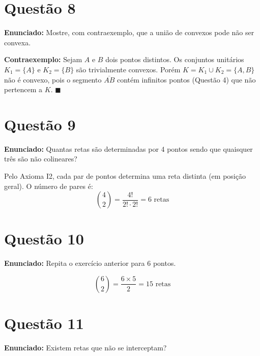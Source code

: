 \documentclass[12pt,a4paper]{article}
\begin{document}
\section*{Quest\~ao 8}

\textbf{Enunciado:} Mostre, com contraexemplo, que a uni\~ao de convexos pode n\~ao ser convexa.

\textbf{Contraexemplo:} Sejam $A$ e $B$ dois pontos distintos. Os conjuntos unit\'arios $K_1 = \{A\}$ e $K_2 = \{B\}$ s\~ao trivialmente convexos. Por\'em $K = K_1 \cup K_2 = \{A, B\}$ n\~ao \'e convexo, pois o segmento $\overline{AB}$ cont\'em infinitos pontos (Quest\~ao 4) que n\~ao pertencem a $K$. $\blacksquare$

\section*{Quest\~ao 9}

\textbf{Enunciado:} Quantas retas s\~ao determinadas por 4 pontos sendo que quaisquer tr\^es s\~ao n\~ao colineares?

Pelo Axioma I2, cada par de pontos determina uma reta distinta (em posi\c{c}\~ao geral). O n\'umero de pares \'e:
$$\binom{4}{2} = \frac{4!}{2!\cdot 2!} = \boxed{6 \text{ retas}}$$

\section*{Quest\~ao 10}

\textbf{Enunciado:} Repita o exerc\'icio anterior para 6 pontos.

$$\binom{6}{2} = \frac{6 \times 5}{2} = \boxed{15 \text{ retas}}$$

\section*{Quest\~ao 11}

\textbf{Enunciado:} Existem retas que n\~ao se interceptam?
\end{document}
